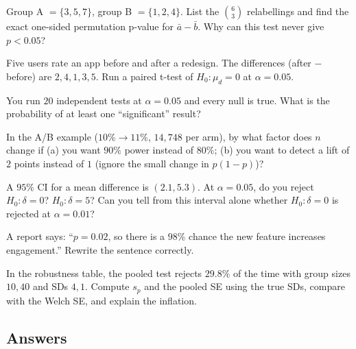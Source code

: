 \begin{exercise}
Group A $=\{3,5,7\}$, group B $=\{1,2,4\}$. List the $\binom{6}{3}$ relabellings and find
the exact one-sided permutation p-value for $\bar a-\bar b$. Why can this test never
give $p<0.05$?
\end{exercise}

\begin{exercise}
Five users rate an app before and after a redesign. The differences (after $-$ before)
are $2, 4, 1, 3, 5$. Run a paired t-test of $H_0\colon\mu_d=0$ at $\alpha=0.05$.
\end{exercise}

\begin{exercise}
You run $20$ independent tests at $\alpha=0.05$ and every null is true. What is the
probability of at least one ``significant'' result?
\end{exercise}

\begin{exercise}
In the A/B example ($10\%\to11\%$, $14{,}748$ per arm), by what factor does $n$ change
if (a) you want $90\%$ power instead of $80\%$; (b) you want to detect a lift of
$2$ points instead of $1$ (ignore the small change in $p(1-p)$)?
\end{exercise}

\begin{exercise}
A $95\%$ CI for a mean difference is $(2.1, 5.3)$. At $\alpha=0.05$, do you reject
$H_0\colon\delta=0$? $H_0\colon\delta=5$? Can you tell from this interval alone whether
$H_0\colon\delta=0$ is rejected at $\alpha=0.01$?
\end{exercise}

\begin{exercise}
A report says: ``$p=0.02$, so there is a $98\%$ chance the new feature increases
engagement.'' Rewrite the sentence correctly.
\end{exercise}

\begin{exercise}
In the robustness table, the pooled test rejects $29.8\%$ of the time with group
sizes $10,40$ and SDs $4,1$. Compute $s_p$ and the pooled SE using the true SDs, compare
with the Welch SE, and explain the inflation.
\end{exercise}

\subsection*{Answers}

